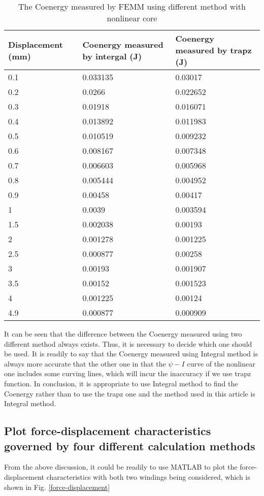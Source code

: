 \documentclass[a4paper]{IEEEtran}
\begin{document}
{\begin{table}[h!]
\centering
\caption{The Coenergy measured by FEMM using different method with nonlinear core}
\label{table:1}
\begin{tabular}{|p{2.5cm}p{2.5cm}p{2.5cm}|} 
	\hline
	Displacement (mm) & Coenergy measured by intergal (J)& Coenergy measured by trapz (J)\\  
	\hline\hline
	0.1	& 0.033135 & 0.03017\\
	\hline
	0.2	& 0.0266 &0.022652\\
	\hline
	0.3	& 0.01918 & 0.016071\\
	\hline
	0.4	& 0.013892 & 0.011983\\
	\hline
	0.5	& 0.010519 & 0.009232\\
	\hline
	0.6	& 0.008167 & 0.007348\\
	\hline
	0.7	& 0.006603 & 0.005968\\
	\hline
	0.8	& 0.005444 & 0.004952\\
	\hline
	0.9	& 0.00458 & 0.00417\\
	\hline
	1 & 0.0039 & 0.003594\\
	\hline
	1.5 & 0.002038 & 0.00193\\
	\hline
	2 & 0.001278 & 0.001225\\
	\hline
	2.5 & 0.000877 & 0.00258\\
	\hline
	3 & 0.00193 & 0.001907\\
	\hline
	3.5 & 0.00152 & 0.001523\\
	\hline
	4 & 0.001225 & 0.00124\\
	\hline
	4.9 & 0.000877 & 0.000909\\
	\hline
\end{tabular}

\end{table}
It can be seen that the difference between the Coenergy measured using two different method always
exists. Thus, it is necessary to decide which one should be used. It is readily to say that the Coenergy
measured using Integral method is always more accurate that the other one in that the $\psi-I$ curve of 
the nonlinear one includes some curving lines, which will incur the inaccuracy if we use trapz function.
In conclusion, it is appropriate to use Integral method to find the Coenergy rather than to use the trapz one
and the method used in this article is Integral method.

\subsection{Plot force-displacement characteristics governed by four different calculation methods}
From the above discussion, it could be readily to use MATLAB to plot the force-displacement characteristics with both two windings being considered,
which is shown in Fig. \ref{force-displacement}

}
\end{document}
